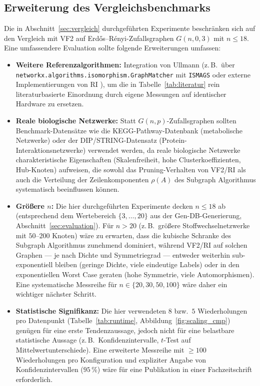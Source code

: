 \documentclass[a4paper,12pt, twoside]{report}
\theoremstyle{definition}
\begin{document}
\subsection{Erweiterung des Vergleichsbenchmarks}
\label{sec:bench_erweiterung}

Die in Abschnitt~\ref{sec:vergleich} durchgeführten Experimente beschränken sich auf den Vergleich mit VF2 auf Erdős–Rényi-Zufallsgraphen $G(n,0{,}3)$ mit $n\le 18$. Eine umfassendere Evaluation sollte folgende Erweiterungen umfassen:

\begin{itemize}
	\item \textbf{Weitere Referenzalgorithmen:} Integration von Ullmann \cite{ullmann1976} (z.\,B.\ über \texttt{networkx.algorithms.isomorphism.GraphMatcher} mit \texttt{ISMAGS} oder externe Implementierungen von RI \cite{bonnici2013}), um die in Tabelle~\ref{tab:literatur} rein literaturbasierte Einordnung durch eigene Messungen auf identischer Hardware zu ersetzen.
	\item \textbf{Reale biologische Netzwerke:} Statt $G(n,p)$-Zufallsgraphen sollten Benchmark-Datensätze wie die KEGG-Pathway-Datenbank (metabolische Netzwerke) oder der DIP/STRING-Datensatz (Protein-Interaktionsnetzwerke) verwendet werden, da reale biologische Netzwerke charakteristische Eigenschaften (Skalenfreiheit, hohe Clusterkoeffizienten, Hub-Knoten) aufweisen, die sowohl das Pruning-Verhalten von VF2/RI als auch die Verteilung der Zeilenkomponenten $\rho(A)$ des Subgraph Algorithmus systematisch beeinflussen können.
	\item \textbf{Größere $n$:} Die hier durchgeführten Experimente decken $n\le 18$ ab (entsprechend dem Wertebereich $\{3,\ldots,20\}$ aus der Gen-DB-Generierung, Abschnitt~\ref{sec:evaluation}). Für $n>20$ (z.\,B.\ größere Stoffwechselnetzwerke mit $50$--$200$ Knoten) wäre zu erwarten, dass die kubische Schranke des Subgraph Algorithmus zunehmend dominiert, während VF2/RI auf solchen Graphen — je nach Dichte und Symmetriegrad — entweder weiterhin sub-exponentiell bleiben (geringe Dichte, viele eindeutige Labels) oder in den exponentiellen Worst Case geraten (hohe Symmetrie, viele Automorphismen). Eine systematische Messreihe für $n\in\{20,30,50,100\}$ wäre daher ein wichtiger nächster Schritt.
	\item \textbf{Statistische Signifikanz:} Die hier verwendeten $8$ bzw.\ $5$ Wiederholungen pro Datenpunkt (Tabelle~\ref{tab:runtime}, Abbildung~\ref{fig:scaling_cmp}) genügen für eine erste Tendenzaussage, jedoch nicht für eine belastbare statistische Aussage (z.\,B.\ Konfidenzintervalle, $t$-Test auf Mittelwertunterschiede). Eine erweiterte Messreihe mit $\ge 100$ Wiederholungen pro Konfiguration und expliziter Angabe von Konfidenzintervallen ($95\,\%$) wäre für eine Publikation in einer Fachzeitschrift erforderlich.

\end{itemize}
\end{document}
